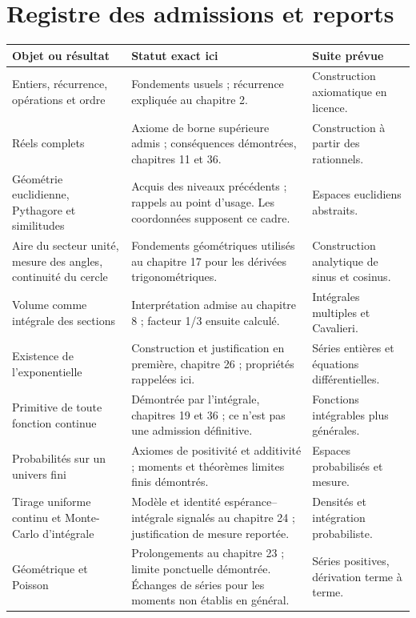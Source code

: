 \section{Registre des admissions et reports}
\begin{longtable}{@{}>{\raggedright\arraybackslash}p{}>{\raggedright\arraybackslash}p{}>{\raggedright\arraybackslash}p{}@{}}
\toprule Objet ou résultat & Statut exact ici & Suite prévue \\ \midrule\endhead
Entiers, récurrence, opérations et ordre & Fondements usuels ; récurrence expliquée au chapitre 2. & Construction axiomatique en licence.\\
Réels complets & Axiome de borne supérieure admis ; conséquences démontrées, chapitres 11 et 36. & Construction à partir des rationnels.\\
Géométrie euclidienne, Pythagore et similitudes & Acquis des niveaux précédents ; rappels au point d'usage. Les coordonnées supposent ce cadre. & Espaces euclidiens abstraits.\\
Aire du secteur unité, mesure des angles, continuité du cercle & Fondements géométriques utilisés au chapitre 17 pour les dérivées trigonométriques. & Construction analytique de sinus et cosinus.\\
Volume comme intégrale des sections & Interprétation admise au chapitre 8 ; facteur 1/3 ensuite calculé. & Intégrales multiples et Cavalieri.\\
Existence de l’exponentielle & Construction et justification en première, chapitre 26 ; propriétés rappelées ici. & Séries entières et équations différentielles.\\
Primitive de toute fonction continue & Démontrée par l’intégrale, chapitres 19 et 36 ; ce n’est pas une admission définitive. & Fonctions intégrables plus générales.\\
Probabilités sur un univers fini & Axiomes de positivité et additivité ; moments et théorèmes limites finis démontrés. & Espaces probabilisés et mesure.\\
Tirage uniforme continu et Monte-Carlo d’intégrale & Modèle et identité espérance--intégrale signalés au chapitre 24 ; justification de mesure reportée. & Densités et intégration probabiliste.\\
Géométrique et Poisson & Prolongements au chapitre 23 ; limite ponctuelle démontrée. Échanges de séries pour les moments non établis en général. & Séries positives, dérivation terme à terme.\\

\end{longtable}
